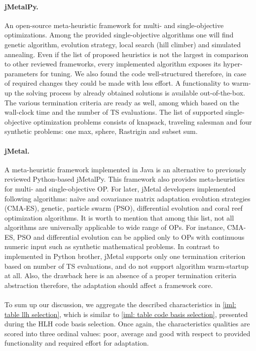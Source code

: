 \paragraph{jMetalPy.} An open-source meta-heuristic framework for multi- and single-objective optimizations. Among the provided single-objective algorithms one will find genetic algorithm, evolution strategy, local search (hill climber) and simulated annealing. Even if the list of proposed heuristics is not the largest in comparison to other reviewed frameworks, every implemented algorithm exposes its hyper-parameters for tuning. We also found the code well-structured therefore, in case of required changes they could be made with less effort. A functionality to warm-up the solving process by already obtained solutions is available out-of-the-box. The various termination criteria are ready as well, among which based on the wall-clock time and the number of TS evaluations. The list of supported single-objective optimization problems consists of knapsack, traveling salesman and four synthetic problems: one max, sphere, Rastrigin and subset sum.

\paragraph{jMetal.} A meta-heuristic framework implemented in Java is an alternative to previously reviewed Python-based jMetalPy. This framework also provides meta-heuristics for multi- and single-objective OP. For later, jMetal developers implemented following algorithms:  na\"ive and covariance matrix adaptation evolution strategies (CMA-ES), genetic, particle swarm (PSO), differential evolution and coral reef optimization algorithms. It is worth to mention that among this list, not all algorithms are universally applicable to wide range of OPs. For instance, CMA-ES, PSO and differential evolution can be applied only to OPs with continuous numeric input such as synthetic mathematical problems. In contrast to implemented in Python brother, jMetal supports only one termination criterion based on number of TS evaluations, and do not support algorithm warm-startup at all. Also, the drawback here is an absence of a proper termination criteria abstraction therefore, the adaptation should affect a framework core.

\paragraph{} To sum up our discussion, we aggregate the described characteristics in \cref{iml: table llh selection}, which is similar to \cref{iml: table code basis selection}, presented during the HLH code basis selection. Once again, the characteristics qualities are scored into three ordinal values: poor, average and good with respect to provided functionality and required effort for adaptation.


